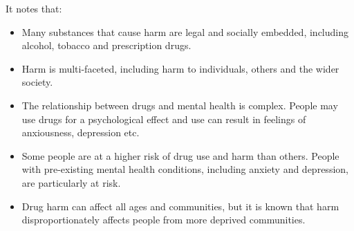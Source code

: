 It notes that:

\begin{itemize}[noitemsep]
    \item Many substances that cause harm are legal and socially embedded, including alcohol, tobacco and prescription drugs.
    \item Harm is multi-faceted, including harm to individuals, others and the wider society.
    \item The relationship between drugs and mental health is complex. People may use drugs for a psychological effect and use can result in feelings of anxiousness, depression etc.
    \item Some people are at a higher risk of drug use and harm than others. People with pre-existing mental health conditions, including anxiety and depression, are particularly at risk.
    \item Drug harm can affect all ages and communities, but it is known that harm disproportionately affects people from more deprived communities.
\end{itemize}



